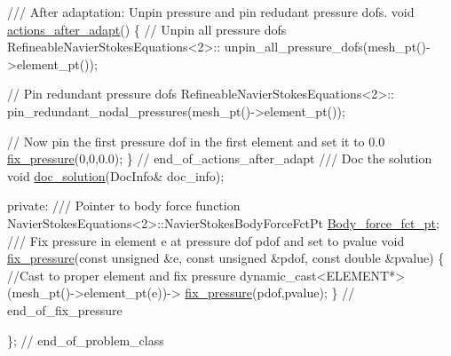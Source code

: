 \begin{DoxyCodeInclude}
\textcolor{comment}{}
\textcolor{comment}{ /// After adaptation: Unpin pressure and pin redudant pressure dofs.}
\textcolor{comment}{} \textcolor{keywordtype}{void} \hyperlink{classQuarterCircleDrivenCavityProblem_a4873f31ccf76e340abb284b17430c407}{actions\_after\_adapt}()
  \{
   \textcolor{comment}{// Unpin all pressure dofs}
   RefineableNavierStokesEquations<2>::
    unpin\_all\_pressure\_dofs(mesh\_pt()->element\_pt());

   \textcolor{comment}{// Pin redundant pressure dofs}
   RefineableNavierStokesEquations<2>::
    pin\_redundant\_nodal\_pressures(mesh\_pt()->element\_pt());
   
   \textcolor{comment}{// Now pin the first pressure dof in the first element and set it to 0.0}
   \hyperlink{classQuarterCircleDrivenCavityProblem_a0c4e0cb1a4fb12053142fa43f899a5b1}{fix\_pressure}(0,0,0.0);
  \} \textcolor{comment}{// end\_of\_actions\_after\_adapt}
 \textcolor{comment}{}
\textcolor{comment}{ /// Doc the solution}
\textcolor{comment}{} \textcolor{keywordtype}{void} \hyperlink{classQuarterCircleDrivenCavityProblem_a390b7b3c027a0253a2a3ac42f9715736}{doc\_solution}(DocInfo& doc\_info);
 
\textcolor{keyword}{private}:
\textcolor{comment}{}
\textcolor{comment}{ /// Pointer to body force function}
\textcolor{comment}{} NavierStokesEquations<2>::NavierStokesBodyForceFctPt \hyperlink{classQuarterCircleDrivenCavityProblem_a66bd39fdcb467ebdb6afe9446d4566f3}{Body\_force\_fct\_pt};
\textcolor{comment}{}
\textcolor{comment}{ /// Fix pressure in element e at pressure dof pdof and set to pvalue}
\textcolor{comment}{} \textcolor{keywordtype}{void} \hyperlink{classQuarterCircleDrivenCavityProblem_a0c4e0cb1a4fb12053142fa43f899a5b1}{fix\_pressure}(\textcolor{keyword}{const} \textcolor{keywordtype}{unsigned} &e, \textcolor{keyword}{const} \textcolor{keywordtype}{unsigned} &pdof, 
                   \textcolor{keyword}{const} \textcolor{keywordtype}{double} &pvalue)
  \{
   \textcolor{comment}{//Cast to proper element and fix pressure}
   \textcolor{keyword}{dynamic\_cast<}ELEMENT*\textcolor{keyword}{>}(mesh\_pt()->element\_pt(e))->
                          \hyperlink{classQuarterCircleDrivenCavityProblem_a0c4e0cb1a4fb12053142fa43f899a5b1}{fix\_pressure}(pdof,pvalue);
  \} \textcolor{comment}{// end\_of\_fix\_pressure}

\}; \textcolor{comment}{// end\_of\_problem\_class}

\end{DoxyCodeInclude}




